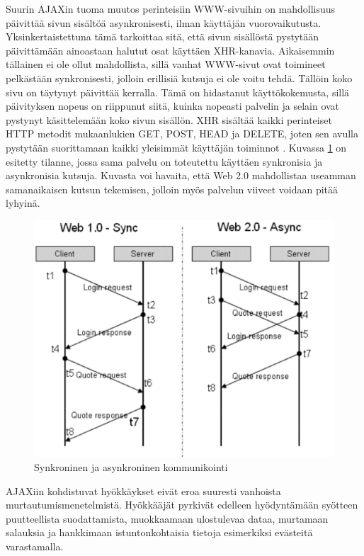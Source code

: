 Suurin AJAXin tuoma muutos perinteisiin WWW-sivuihin on mahdollisuus
päivittää sivun sisältöä asynkronisesti, ilman käyttäjän
vuorovaikutusta. Yksinkertaistettuna tämä tarkoittaa sitä, että sivun
sisällöstä pystytään päivittämään ainoastaan halutut osat käyttäen
XHR-kanavia. Aikaisemmin tällainen ei ole ollut mahdollista, sillä
vanhat WWW-sivut ovat toimineet pelkästään synkronisesti, jolloin
erillisiä kutsuja ei ole voitu tehdä. Tällöin koko sivu on täytynyt
päivittää kerralla. Tämä on hidastanut käyttökokemusta, sillä
päivityksen nopeus on riippunut siitä, kuinka nopeasti palvelin ja
selain ovat pystynyt käsittelemään koko sivun sisällön. XHR sisältää
kaikki perinteiset HTTP metodit mukaanlukien GET, POST, HEAD ja
DELETE, joten sen avulla pystytään suorittamaan kaikki yleisimmät
käyttäjän toiminnot \cite{WEB2}. Kuvassa \ref{synkroninen} on esitetty
tilanne, jossa sama palvelu on toteutettu käyttäen synkronisia ja
asynkronisia kutsuja. Kuvasta voi havaita, että Web 2.0 mahdollistaa
useamman samanaikaisen kutsun tekemisen, jolloin myös palvelun viiveet
voidaan pitää lyhyinä.

\begin{figure}[htp]
\centering
\includegraphics[width=12cm]{pics/synkroninen.pdf}
\caption{Synkroninen ja asynkroninen kommunikointi}
\label{synkroninen}
\end{figure}

AJAXiin kohdistuvat hyökkäykset eivät eroa suuresti vanhoista
murtautumismenetelmistä. Hyökkääjät pyrkivät edelleen hyödyntämään
syötteen puutteellista suodattamista, muokkaamaan ulostulevaa dataa,
murtamaan salauksia ja hankkimaan istuntonkohtaisia tietoja
esimerkiksi evästeitä varastamalla.

